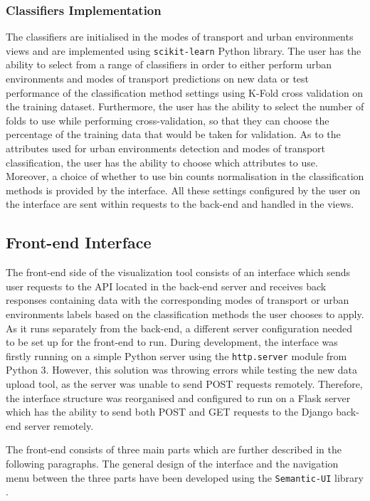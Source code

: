 \documentclass[bsc,frontabs,twoside,singlespacing,parskip,deptreport]{infthesis}     %
\begin{document}
\subsubsection*{Classifiers Implementation}

The classifiers are initialised in the modes of transport and urban environments views and are implemented using \texttt{scikit-learn} \cite{scikit-learn} Python library. The user has the ability to select from a range of classifiers in order to either perform urban environments and modes of transport predictions on new data or test performance of the classification method settings using K-Fold cross validation on the training dataset. Furthermore, the user has the ability to select the number of folds to use while performing cross-validation, so that they can choose the percentage of the training data that would be taken for validation. As to the attributes used for urban environments detection and modes of transport classification, the user has the ability to choose which attributes to use. Moreover, a choice of whether to use bin counts normalisation in the classification methods is provided by the interface. All these settings configured by the user on the interface are sent within requests to the back-end and handled in the views.


\subsection{Front-end Interface}
\label{subsec:front-end}

The front-end side of the visualization tool consists of an interface which sends user requests to the API located in the back-end server and receives back responses containing data with the corresponding modes of transport or urban environments labels based on the classification methods the user chooses to apply. As it runs separately from the back-end, a different server configuration needed to be set up for the front-end to run. During development, the interface was firstly running on a simple Python server using the \texttt{http.server} module from Python 3. However, this solution was throwing errors while testing the new data upload tool, as the server was unable to send POST requests remotely. Therefore, the interface structure was reorganised and configured to run on a Flask server \cite{flask} which has the ability to send both POST and GET requests to the Django back-end server remotely.

The front-end consists of three main parts which are further described in the following paragraphs. The general design of the interface and the navigation menu between the three parts have been developed using the \texttt{Semantic-UI} library \cite{semantic-ui}.
\end{document}
